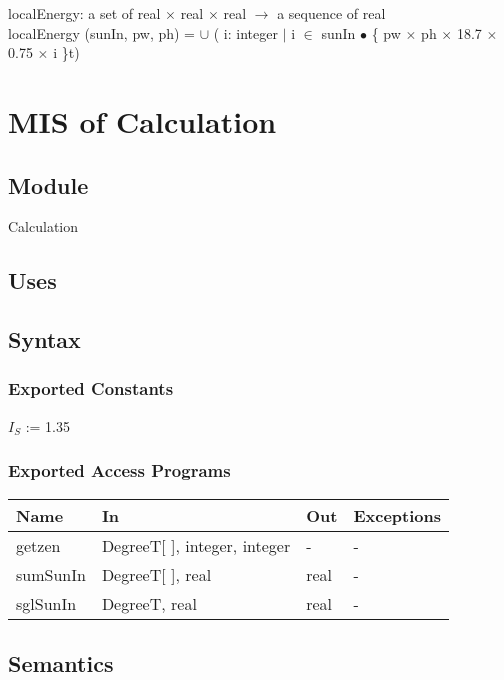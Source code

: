 \documentclass[12pt, titlepage]{article}
\begin{document}
localEnergy: a set of real $\times$ real $\times$ real $\rightarrow$ a sequence of real\\
localEnergy (sunIn, pw, ph) =  $\cup$ ( i: integer $|$ i $\in$ sunIn $\bullet$ \{ pw $\times$ ph $\times$ 18.7 $\times$ 0.75 $\times$ i \}t)


\section{MIS of Calculation} \label{ModuleC} 

\subsection{Module}
Calculation\\


\subsection{Uses}


\subsection{Syntax}

\subsubsection{Exported Constants}
$I_{S}$ := 1.35\\

\subsubsection{Exported Access Programs}

\begin{center}
\begin{tabular}{p{2cm} p{4cm} p{4cm} p{2cm}}
\hline
\textbf{Name} & \textbf{In} & \textbf{Out} & \textbf{Exceptions} \\
\hline
getzen & DegreeT[ ], integer, integer & - & - \\
sumSunIn & DegreeT[ ], real & real & - \\
sglSunIn & DegreeT, real & real & - \\

\hline
\end{tabular}
\end{center}

\subsection{Semantics}
\end{document}
